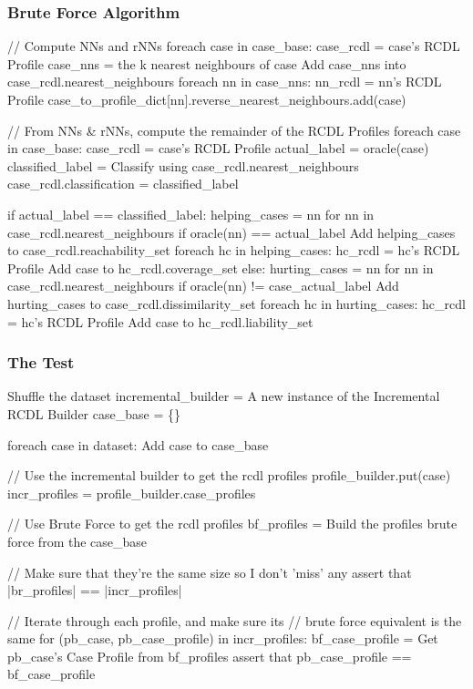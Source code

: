 \documentclass[a4paper,11pt]{report}
\begin{document}
\begin{samepage}
\subsubsection{Brute Force Algorithm}
\begin{code}
// Compute NNs and rNNs
foreach case in case_base:
  case_rcdl = case's RCDL Profile
  case_nns = the k nearest neighbours of case
  Add case_nns into case_rcdl.nearest_neighbours
  foreach nn in case_nns:
    nn_rcdl = nn's RCDL Profile
    case_to_profile_dict[nn].reverse_nearest_neighbours.add(case)

// From NNs & rNNs, compute the remainder of the RCDL Profiles
foreach case in case_base:
  case_rcdl = case's RCDL Profile
  actual_label = oracle(case)
  classified_label = Classify using case_rcdl.nearest_neighbours
  case_rcdl.classification = classified_label
  
  if actual_label == classified_label:
    helping_cases = {nn for nn in case_rcdl.nearest_neighbours 
                     if oracle(nn) == actual_label}
    Add helping_cases to case_rcdl.reachability_set
    foreach hc in helping_cases:
      hc_rcdl = hc's RCDL Profile
      Add case to hc_rcdl.coverage_set
  else:
    hurting_cases = {nn for nn in case_rcdl.nearest_neighbours 
                     if oracle(nn) != case_actual_label}
    Add hurting_cases to case_rcdl.dissimilarity_set
    foreach hc in hurting_cases:
      hc_rcdl = hc's RCDL Profile
      Add case to hc_rcdl.liability_set
\end{code}
\end{samepage}

\medspace
\vspace{10pt}

\begin{samepage}
\subsubsection{The Test}
\begin{code}
Shuffle the dataset
incremental_builder = A new instance of the Incremental RCDL Builder
case_base = \{\}

foreach case in dataset:
  Add case to case_base
  
  // Use the incremental builder to get the rcdl profiles
  profile_builder.put(case)
  incr_profiles = profile_builder.case_profiles
  
  // Use Brute Force to get the rcdl profiles
  bf_profiles = Build the profiles brute force from the case_base
  
  // Make sure that they're the same size so I don't 'miss' any
  assert that |br_profiles| == |incr_profiles|
  
  // Iterate through each profile, and make sure its 
  // brute force equivalent is the same
  for (pb_case, pb_case_profile) in incr_profiles:
      bf_case_profile = Get pb_case's Case Profile from bf_profiles
      assert that pb_case_profile == bf_case_profile
\end{code}

\end{samepage}
\end{document}
